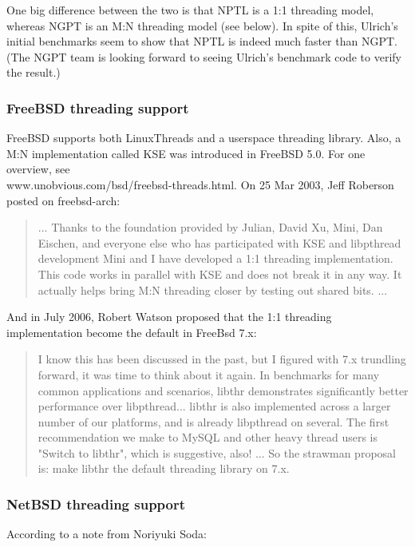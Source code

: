 \documentclass[twoside, xetex]{report}
\begin{document}
One big difference between the two is that NPTL is a 1:1 threading model, whereas NGPT is an M:N threading model (see below). In spite of this, Ulrich's initial benchmarks seem to show that NPTL is indeed much faster than NGPT. (The NGPT team is looking forward to seeing Ulrich's benchmark code to verify the result.)

\subsubsection*{FreeBSD threading support}

FreeBSD supports both LinuxThreads and a userspace threading library. Also, a M:N implementation called KSE was introduced in FreeBSD 5.0. For one overview, see \\www.unobvious.com/bsd/freebsd-threads.html.
On 25 Mar 2003, Jeff Roberson posted on freebsd-arch:

\begin{quotation}
... Thanks to the foundation provided by Julian, David Xu, Mini, Dan Eischen, and everyone else who has participated with KSE and libpthread development Mini and I have developed a 1:1 threading implementation. This code works in parallel with KSE and does not break it in any way. It actually helps bring M:N threading closer by testing out shared bits. ...
\end{quotation}

And in July 2006, Robert Watson proposed that the 1:1 threading implementation become the default in FreeBsd 7.x:

\begin{quotation}
I know this has been discussed in the past, but I figured with 7.x trundling forward, it was time to think about it again. In benchmarks for many common applications and scenarios, libthr demonstrates significantly better performance over libpthread... libthr is also implemented across a larger number of our platforms, and is already libpthread on several. The first recommendation we make to MySQL and other heavy thread users is "Switch to libthr", which is suggestive, also! ... So the strawman proposal is: make libthr the default threading library on 7.x.
\end{quotation}

\subsubsection*{NetBSD threading support}

According to a note from Noriyuki Soda:
\end{document}
